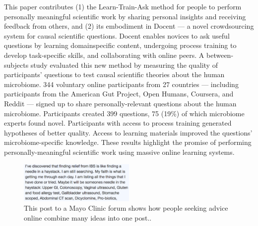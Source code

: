 This paper contributes (1) the Learn-Train-Ask method for
people to perform personally meaningful scientific work by
sharing personal insights and receiving feedback from
others, and (2) its embodiment in Docent — a novel
crowdsourcing system for causal scientific questions. Docent
enables novices to ask useful questions by learning domainspecific
content, undergoing process training to develop
task-specific skills, and collaborating with online peers. A
between-subjects study evaluated this new method by measuring
the quality of participants’ questions to test causal scientific
theories about the human microbiome. 344 voluntary
online participants from 27 countries — including participants
from the American Gut Project, Open Humans,
Coursera, and Reddit — signed up to share personally-relevant
questions about the human microbiome. Participants
created 399 questions, 75 (19\%) of which microbiome experts
found novel. Participants with access to process training
generated hypotheses of better quality. Access to
learning materials improved the questions’ microbiome-specific
knowledge. These results highlight the promise of performing
personally-meaningful scientific work using
massive online learning systems.



\begin{figure}
  \centering
  \includegraphics[width=0.5\textwidth]{figures/docent/fig-1.png}
  \caption[Post to a Mayo Clinic forum]
{This post to a Mayo Clinic forum shows how people
seeking advice online combine many ideas into one post..}
  \label{fig:docent-1}
\end{figure}

